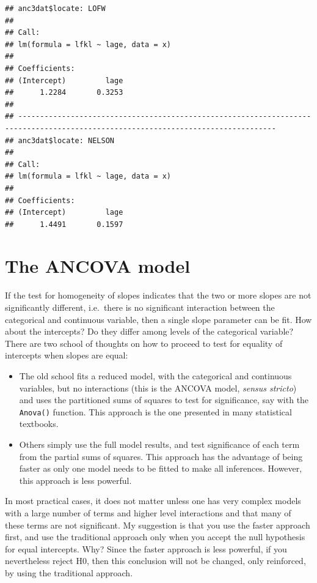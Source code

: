 \documentclass[
  12pt,
]{book}
\providecommand{\tightlist}{%
  \setlength{\itemsep}{0pt}\setlength{\parskip}{0pt}}
\begin{document}
\begin{verbatim}
## anc3dat$locate: LOFW        
## 
## Call:
## lm(formula = lfkl ~ lage, data = x)
## 
## Coefficients:
## (Intercept)         lage  
##      1.2284       0.3253  
## 
## --------------------------------------------------------------------------------------------------------------------------------- 
## anc3dat$locate: NELSON      
## 
## Call:
## lm(formula = lfkl ~ lage, data = x)
## 
## Coefficients:
## (Intercept)         lage  
##      1.4491       0.1597
\end{verbatim}

\hypertarget{the-ancova-model}{%
\section{The ANCOVA model}\label{the-ancova-model}}

If the test for homogeneity of slopes indicates that the two or more slopes are not significantly different, i.e.~there is no significant interaction between the categorical and continuous variable, then a single slope parameter can be fit. How about the intercepts? Do they differ among levels of the categorical variable? There are two school of thoughts on how to proceed to test for equality of intercepts when slopes are equal:

\begin{itemize}
\tightlist
\item
  The old school fits a reduced model, with the categorical and continuous variables, but no interactions (this is the ANCOVA model, \emph{sensus stricto}) and uses the partitioned sums of squares to test for significance, say with the \texttt{Anova()} function. This approach is the one presented in many statistical textbooks.
\item
  Others simply use the full model results, and test significance of each term from the partial sums of squares. This approach has the advantage of being faster as only one model needs to be fitted to make all inferences. However, this approach is less powerful.
\end{itemize}

In most practical cases, it does not matter unless one has very complex models with a large number of terms and higher level interactions and that many of these terms are not significant. My suggestion is that you use the faster approach first, and use the traditional approach only when you accept the null hypothesis for equal intercepts. Why? Since the faster approach is less powerful, if you nevertheless reject H0, then this conclusion will not be changed, only reinforced, by using the traditional approach.
\end{document}
